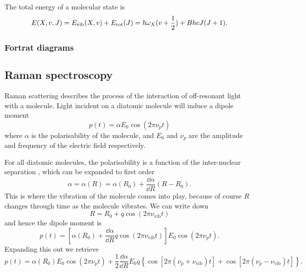 The total energy of a molecular state is
%
\begin{equation}
  E(X, v, J) = E_\text{vib}(X, v) + E_\text{rot}(J) \\
  = \hbar\omega_X(v + \frac{1}{2}) + BhcJ(J+1).
\end{equation}
%

\subsubsection{Fortrat diagrams}


\subsection{Raman spectroscopy}

Raman scattering describes the process of the interaction of off-resonant light
with a molecule.  Light incident on a diatomic molecule will induce a dipole
moment
%
\begin{equation}
  p(t) = \alpha E_0 \cos(2\pi\nu_p t)
\end{equation}
%
where $\alpha$ is the polarisability of the molecule, and $E_0$ and $\nu_p$ are
the amplitude and frequency of the electric field respectively.

For all diatomic molecules, the polarisability is a function of the
inter-nuclear separation \cite{}, which can be expanded to first order
%
\begin{equation}
\alpha = \alpha(R) = \alpha(R_0) + \frac{\dd \alpha}{\dd R}(R - R_0).
\end{equation}
%
This is where the vibration of the molecule comes into play, because of course
$R$ changes through time as the molecule vibrates. We can write down
%
\begin{equation}
R = R_0 + q \cos (2\pi \nu_\text{vib} t)
\end{equation}
and hence the dipole moment is
\begin{equation}
p(t) = \left[ \alpha(R_0) + \frac{\dd \alpha}{\dd R} q\cos (2\pi\nu_\text{vib}t)
\right] E_0 \cos(2\pi\nu_p t).
\end{equation}
Expanding this out we retrieve
\begin{equation}
p(t) = \alpha(R_0)E_0\cos(2\pi\nu_p t) + \frac{1}{2}\frac{\dd \alpha}{\dd R}
E_0 q \left\{ \cos\left[ 2\pi(\nu_p + \nu_\text{vib})t\right]
+ \cos\left[ 2\pi(\nu_p - \nu_\text{vib})t\right] \right\}.
\end{equation}

